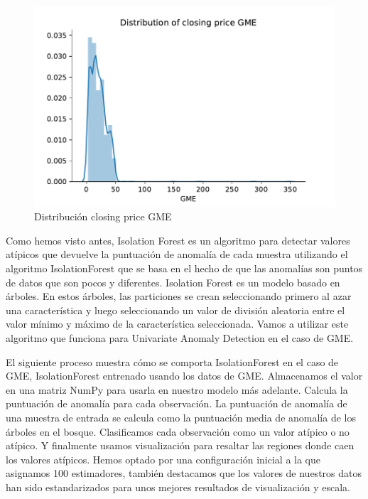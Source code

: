 \documentclass[12pt,twoside]{report}
\begin{document}
\begin{figure}[H]
\includegraphics[width=\textwidth]{../code/figures/distribution_closing_price_GME.pdf}
\centering
\caption{Distribución closing price GME}
\label{fig:dist-closing-GME}
\end{figure}

Como hemos visto antes, Isolation Forest es un algoritmo para detectar valores atípicos que devuelve la puntuación de anomalía de cada muestra utilizando el algoritmo IsolationForest que se basa en el hecho de que las anomalías son puntos de datos que son pocos y diferentes. Isolation Forest es un modelo basado en árboles. En estos árboles, las particiones se crean seleccionando primero al azar una característica y luego seleccionando un valor de división aleatoria entre el valor mínimo y máximo de la característica seleccionada. Vamos a utilizar este algoritmo que funciona para Univariate Anomaly Detection en el caso de GME. 

El siguiente proceso muestra cómo se comporta IsolationForest en el caso de GME, IsolationForest entrenado usando los datos de GME. Almacenamos el valor en una matriz NumPy para usarla en nuestro modelo más adelante. Calcula la puntuación de anomalía para cada observación. La puntuación de anomalía de una muestra de entrada se calcula como la puntuación media de anomalía de los árboles en el bosque. Clasificamos cada observación como un valor atípico o no atípico. Y finalmente usamos visualización para resaltar las regiones donde caen los valores atípicos.
Hemos optado por una configuración inicial a la que asignamos 100 estimadores, también destacamos que los valores de nuestros datos han sido estandarizados para unos mejores resultados de visualización y escala.
\end{document}
